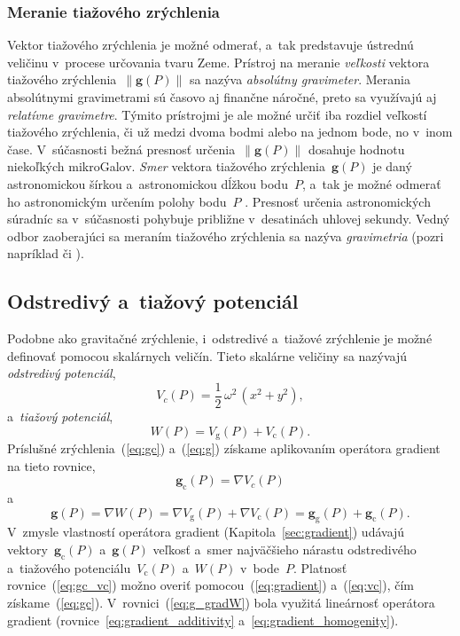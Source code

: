 \documentclass[a4paper,12pt]{book}
\newcommand{\gidx}{\mathrm g}
\newcommand{\cidx}{\mathrm c}
\let\vec\mathbf
\begin{document}
\subsubsection{Meranie tiažového zrýchlenia}
\label{sec:gravity_measurements}

Vektor tiažového zrýchlenia je možné odmerať, a~tak predstavuje ústrednú 
veličinu v~procese určovania tvaru Zeme.  Prístroj na meranie \emph{veľkosti} 
vektora tiažového zrýchlenia~$\| \vec g(P) \|$ sa nazýva \emph{absolútny 
gravimeter}.  Merania absolútnymi gravimetrami sú časovo aj finančne náročné, 
preto sa využívajú aj \emph{relatívne gravimetre}.  Týmito prístrojmi je ale 
možné určiť iba rozdiel veľkostí tiažového zrýchlenia, či už medzi dvoma bodmi 
alebo na jednom bode, no v~inom čase.  V~súčasnosti bežná presnosť určenia~$\| 
\vec g(P) \|$ dosahuje hodnotu niekoľkých mikroGalov.  \emph{Smer} vektora 
tiažového zrýchlenia~$\vec g(P)$ je daný astronomickou šírkou a~astronomickou 
dĺžkou bodu~$P$, a~tak je možné odmerať ho astronomickým určením polohy 
bodu~$P$ \parencite{MoritzPhysicalGeodesy}.  Presnosť určenia astronomických 
súradníc sa v~súčasnosti pohybuje približne v~desatinách uhlovej sekundy.    
Vedný odbor zaoberajúci sa meraním tiažového zrýchlenia sa nazýva 
\emph{gravimetria} (pozri napríklad \cite{Torge1989,Rozimant1994} či 
\cite{Janak2010}).  






\subsection{Odstredivý a~tiažový potenciál}
\label{sec:centrifugal_and_gravity_potential}

Podobne ako gravitačné zrýchlenie, i~odstredivé a~tiažové zrýchlenie je
možné definovať pomocou skalárnych veličín.  Tieto skalárne veličiny sa
nazývajú \emph{odstredivý potenciál},
%
\begin{equation}
\label{eq:vc}
V_c(P) = \frac{1}{2} \, \omega^2 \, (x^2 + y^2){,}
\end{equation}
%
a~\emph{tiažový potenciál},
%
\begin{equation}
\label{eq:w}
W(P) = V_\gidx(P) + V_\cidx(P){.}
\end{equation}
%
Príslušné zrýchlenia~(\ref{eq:gc}) a~(\ref{eq:g}) získame aplikovaním operátora
gradient na tieto rovnice,
%
\begin{equation}
\label{eq:gc_vc}
\vec g_\cidx(P) = \nabla V_c(P)
\end{equation}
%
a
%
\begin{equation}
\label{eq:g_gradW}
\vec g(P) = \nabla W(P) = \nabla V_\gidx(P) + \nabla V_\cidx(P) = \vec
g_\gidx(P) + \vec g_\cidx(P){.}
\end{equation}
%
V~zmysle vlastností operátora gradient (Kapitola~\ref{sec:gradient}) udávajú 
vektory~$\vec g_\cidx(P)$ a~$\vec g(P)$ veľkosť a~smer najväčšieho nárastu
odstredivého a~tiažového potenciálu~$V_\cidx(P)$ a~$W(P)$ v~bode~$P$.  Platnosť
rovnice~(\ref{eq:gc_vc}) možno overiť pomocou~(\ref{eq:gradient})
a~(\ref{eq:vc}), čím získame~(\ref{eq:gc}).  V~rovnici~(\ref{eq:g_gradW}) bola
využitá lineárnosť operátora gradient (rovnice~\ref{eq:gradient_additivity} 
a~\ref{eq:gradient_homogenity}).
\end{document}
